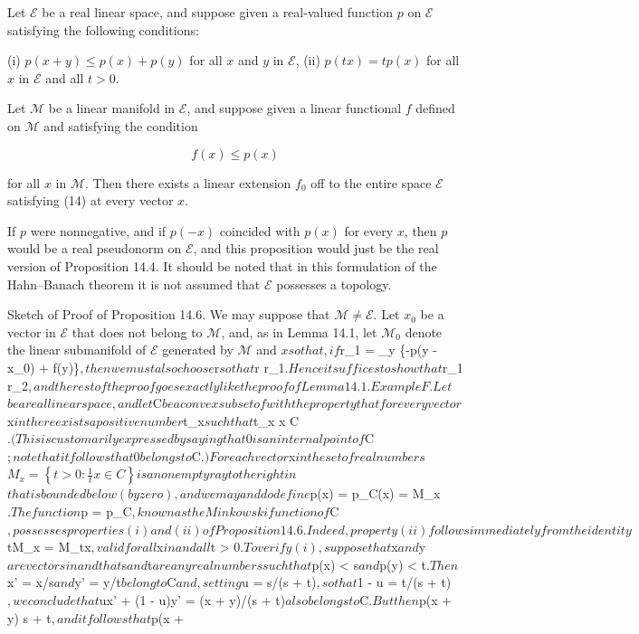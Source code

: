 Let $\mathcal{E}$ be a real linear space, and suppose given a real-valued function $p$ on $\mathcal{E}$ satisfying the following conditions:

(i) $p(x + y) \leq p(x) + p(y)$ for all $x$ and $y$ in $\mathcal{E}$,
(ii) $p(tx) = tp(x)$ for all $x$ in $\mathcal{E}$ and all $t > 0$.

Let $\mathcal{M}$ be a linear manifold in $\mathcal{E}$, and suppose given a linear functional $f$ defined on $\mathcal{M}$ and satisfying the condition

$$f(x) \leq p(x)$$

for all $x$ in $\mathcal{M}$. Then there exists a linear extension $f_0$ off to the entire space $\mathcal{E}$ satisfying (14) at every vector $x$.

If $p$ were nonnegative, and if $p(-x)$ coincided with $p(x)$ for every $x$, then $p$ would be a real pseudonorm on $\mathcal{E}$, and this proposition would just be the real version of Proposition 14.4. It should be noted that in this formulation of the Hahn–Banach theorem it is not assumed that $\mathcal{E}$ possesses a topology.

Sketch of Proof of Proposition 14.6. We may suppose that $\mathcal{M} \neq \mathcal{E}$. Let $x_0$ be a vector in $\mathcal{E}$ that does not belong to $\mathcal{M}$, and, as in Lemma 14.1, let $\mathcal{M}_0$ denote the linear submanifold of $\mathcal{E}$ generated by $\mathcal{M}$ and $x

so that, if $r_1 = \sup_{y \in {}} \{-p(y - x_0) + f(y)\}$, then we must also choose $r$ so that $r \geq r_1$. Hence it suffices to show that $r_1 \leq r_2$, and the rest of the proof goes exactly like the proof of Lemma 14.1.

Example F. Let $$ be a real linear space, and let $C$ be a convex subset of $$ with the property that for every vector $x$ in $$ there exists a positive number $t_x$ such that $t_x x \in C$. (This is customarily expressed by saying that 0 is an internal point of $C$; note that it follows that 0 belongs to $C$.) For each vector $x$ in $$ the set of real numbers

$$M_x = \left\{ t > 0 : \frac{1}{t} x \in C \right\}$$

is a nonempty ray to the right in $$ that is bounded below (by zero), and we may and do define $p(x) = p_C(x) = \inf M_x$. The function $p = p_C$, known as the Minkowski function of $C$, possesses properties (i) and (ii) of Proposition 14.6. Indeed, property (ii) follows immediately from the identity $tM_x = M_{tx}$, valid for all $x$ in $$ and all $t > 0$. To verify (i), suppose that $x$ and $y$ are vectors in $$ and that $s$ and $t$ are any real numbers such that $p(x) < s$ and $p(y) < t$. Then $x' = x/s$ and $y' = y/t$ belong to $C$ and, setting $u = s/(s + t)$, so that $1 - u = t/(s + t)$, we conclude that $ux' + (1 - u)y' = (x + y)/(s + t)$ also belongs to $C$. But then $p(x + y) \leq s + t$, and it follows that $p(x +

